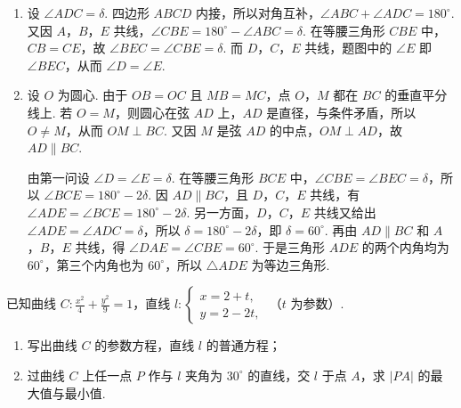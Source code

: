 \begin{solution}
\begin{enumerate}
\item 设 \(\angle ADC=\delta\). 四边形 \(ABCD\) 内接，所以对角互补，\(\angle ABC+\angle ADC=180^\circ\). 又因 \(A\)，\(B\)，\(E\) 共线，\(\angle CBE=180^\circ-\angle ABC=\delta\). 在等腰三角形 \(CBE\) 中，\(CB=CE\)，故 \(\angle BEC=\angle CBE=\delta\). 而 \(D\)，\(C\)，\(E\) 共线，题图中的 \(\angle E\) 即 \(\angle BEC\)，从而 \(\angle D=\angle E\).
\item 设 \(O\) 为圆心. 由于 \(OB=OC\) 且 \(MB=MC\)，点 \(O\)，\(M\) 都在 \(BC\) 的垂直平分线上. 若 \(O=M\)，则圆心在弦 \(AD\) 上，\(AD\) 是直径，与条件矛盾，所以 \(O\ne M\)，从而 \(OM\perp BC\). 又因 \(M\) 是弦 \(AD\) 的中点，\(OM\perp AD\)，故 \(AD\parallel BC\).

由第一问设 \(\angle D=\angle E=\delta\). 在等腰三角形 \(BCE\) 中，\(\angle CBE=\angle BEC=\delta\)，所以 \(\angle BCE=180^\circ-2\delta\). 因 \(AD\parallel BC\)，且 \(D\)，\(C\)，\(E\) 共线，有 \(\angle ADE=\angle BCE=180^\circ-2\delta\). 另一方面，\(D\)，\(C\)，\(E\) 共线又给出 \(\angle ADE=\angle ADC=\delta\)，所以 \(\delta=180^\circ-2\delta\)，即 \(\delta=60^\circ\). 再由 \(AD\parallel BC\) 和 \(A\)，\(B\)，\(E\) 共线，得 \(\angle DAE=\angle CBE=60^\circ\). 于是三角形 \(ADE\) 的两个内角均为 \(60^\circ\)，第三个内角也为 \(60^\circ\)，所以 \(\triangle ADE\) 为等边三角形.
\end{enumerate}
\end{solution}

\begin{problem}
已知曲线 \(C: \frac{x^2}{4} + \frac{y^2}{9} = 1\)，直线 \(l: \begin{cases}
x = 2 + t,\\
y = 2 - 2t,
\end{cases}\) （\(t\) 为参数）.

\begin{enumerate}
\item 写出曲线 \(C\) 的参数方程，直线 \(l\) 的普通方程；
\item 过曲线 \(C\) 上任一点 \(P\) 作与 \(l\) 夹角为 \(30^{\circ}\) 的直线，交 \(l\) 于点 \(A\)，求 \(|PA|\) 的最大值与最小值.
\end{enumerate}
\end{problem}

